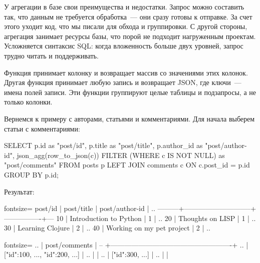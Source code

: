 У агрегации в базе свои преимущества и недостатки. Запрос можно составить так, что данным не требуется обработка~--- они сразу готовы к отправке. За счет этого уходит код, что мы писали для обхода и группировки. С другой стороны, агрегация занимает ресурсы базы, что порой не подходит нагруженным проектам. Усложняется синтаксис SQL: когда вложенность больше двух уровней, запрос трудно читать и поддерживать.

Функция  принимает колонку и возвращает массив  со значениями этих колонок. Другая функция  принимает любую запись и возвращает JSON, где ключи~--- имена полей записи. Эти функции группируют целые таблицы и подзапросы, а не только колонки.

Вернемся к примеру с авторами, статьями и комментариями. Для начала выберем статьи с комментариями:


\begin{english}
  \begin{sql/lines}
SELECT
  p.id        as "post/id",
  p.title     as "post/title",
  p.author_id as "post/author-id",
  json_agg(row_to_json(c)) FILTER
          (WHERE c IS NOT NULL) as "post/comments"
FROM posts p
LEFT JOIN comments c ON c.post_id = p.id
GROUP BY p.id;
  \end{sql/lines}
\end{english}

Результат:

\begin{english}
  \begin{text*}{fontsize=\small}
 post/id |         post/title          | post/author-id | ..
---------+-----------------------------+----------------+---
      10 | Introduction to Python      |              1 | ..
      20 | Thoughts on LISP            |              1 | ..
      30 | Learning Clojure            |              2 | ..
      40 | Working on my pet project   |              2 | ..
  \end{text*}
\end{english}


\begin{english}
  \begin{text*}{fontsize=\small}
.. |                    post/comments                   |
-- +----------------------------------------------------+
.. | [{"id":100, ...}, {"id":200, ...}]                 |
.. |                                                    |
.. | [{"id":300, ...}]                                  |
.. |                                                    |
  \end{text*}
\end{english}

